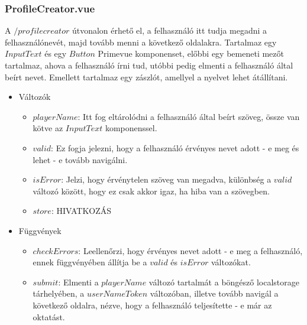 \subsubsection{ProfileCreator.vue}
A $/profilecreator$ útvonalon érhető el, a felhasználó itt tudja megadni a felhasználónevét, majd tovább menni a következő oldalakra. Tartalmaz egy $InputText$ és egy $Button$ Primevue komponenset, előbbi egy bemeneti mezőt tartalmaz, ahova a felhasználó írni tud, utóbbi pedig elmenti a felhasználó által beírt nevet. Emellett tartalmaz egy zászlót, amellyel a nyelvet lehet átállítani.
\begin{itemize}
    \item Változók
    \begin{itemize}
        \item $playerName$: Itt fog eltárolódni a felhasználó által beírt szöveg, össze van kötve az $InputText$ komponenssel.
        \item $valid$: Ez fogja jelezni, hogy a felhasználó érvényes nevet adott - e meg és lehet - e tovább navigálni.
        \item $isError$: Jelzi, hogy érvénytelen szöveg van megadva, különbség a $valid$ változó között, hogy ez csak akkor igaz, ha hiba van a szövegben.
        \item $store$: HIVATKOZÁS
    \end{itemize}
    \item Függvények
    \begin{itemize}
        \item $checkErrors$: Leellenőrzi, hogy érvényes nevet adott - e meg a felhasználó, ennek függvényében állítja be a $valid$ és $isError$ változókat.
        \item $submit$: Elmenti a $playerName$ változó tartalmát a böngésző localstorage tárhelyében, a $userNameToken$ változóban, illetve tovább navigál a következő oldalra, nézve, hogy a felhasználó teljesítette - e már az oktatást.
    \end{itemize}
\end{itemize}

